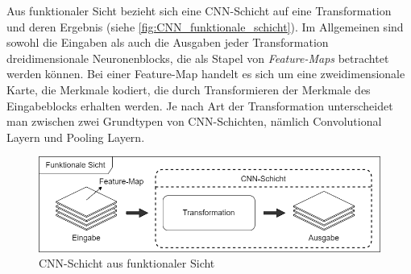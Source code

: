 Aus funktionaler Sicht bezieht sich eine CNN-Schicht auf eine Transformation und deren Ergebnis (siehe \autoref{fig:CNN_funktionale_schicht}). Im Allgemeinen sind sowohl die Eingaben als auch die Ausgaben jeder Transformation dreidimensionale Neuronenblocks, die als Stapel von \emph{Feature-Maps} betrachtet werden können. Bei einer Feature-Map handelt es sich um eine zweidimensionale Karte, die Merkmale kodiert, die durch Transformieren der Merkmale des Eingabeblocks erhalten werden. Je nach Art der Transformation unterscheidet man zwischen zwei Grundtypen von CNN-Schichten, nämlich Convolutional Layern und Pooling Layern.

\begin{figure}[!hb]
	\centering
	\includegraphics[width=\linewidth]{images/CNN_funktionale_schicht}
	\caption{CNN-Schicht aus funktionaler Sicht}
	\label{fig:CNN_funktionale_schicht}
\end{figure}

